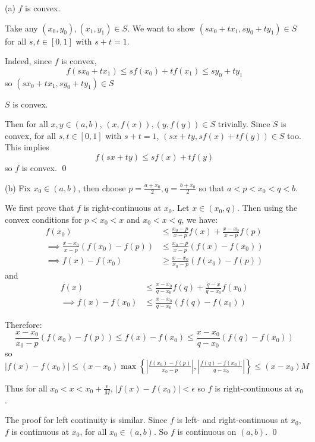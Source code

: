 \documentclass[a4paper, 11pt]{article}
\begin{document}
\begin{solution}
    (a) \pffwd $f$ is convex.
    
    Take any $(x_0, y_0), (x_1, y_1) \in S$. We want to show $(s x_0 + tx_1, sy_0 + ty_1) \in S$ for all $s, t \in [0, 1]$ with $s + t = 1$.

    Indeed, since $f$ is convex,
    \[
    f(sx_0 + tx_1) \leq sf(x_0) + tf(x_1) \leq sy_0 + ty_1
    \]
    so $(s x_0 + tx_1, sy_0 + ty_1) \in S$

    \pfbwd $S$ is convex.
    
    Then for all $x, y \in (a, b)$, $(x, f(x)), (y, f(y)) \in S$ trivially. Since $S$ is convex, for all $s, t \in [0, 1]$ with $s+ t = 1$, $(sx + ty, sf(x) + tf(y)) \in S$ too. This implies
     \[
    f(sx + ty) \leq sf(x) + tf(y)   
    \]
    so $f$ is convex. \qed

    (b) Fix $x_0 \in (a, b)$, then choose $p = \frac{a + x_0}{2}, q = \frac{b + x_0}{2}$ so that $a < p < x_0 < q < b$.

    We first prove that $f$ is right-continuous at $x_0$. Let $x \in (x_0, q)$. Then using the convex conditions for $p < x_0 < x$ and $x_0 < x < q$, we have:
    \begin{align*}
        f(x_0) &\leq \frac{x_0 - p}{x-p}f(x) + \frac{x-x_0}{x-p}f(p) \\
        \implies \frac{x- x_0}{x-p}(f(x_0) - f(p)) & \leq \frac{x_0 - p}{x-p}(f(x) - f(x_0)) \\
        \implies f(x) - f(x_0) &\geq \frac{x-x_0}{x_0 - p}(f(x_0) - f(p))
    \end{align*}
    and
    \begin{align*}
        f(x) & \leq \frac{x- x_0}{q - x_0} f(q) + \frac{q-x}{q-x_0}f(x_0) \\
        \implies f(x) - f(x_0) &\leq \frac{x- x_0}{q-x_0} (f(q) - f(x_0))
    \end{align*}

    Therefore: \[
    \frac{x-x_0}{x_0 - p}(f(x_0) - f(p)) \leq f(x) - f(x_0) \leq \frac{x-x_0}{q-x_0}(f(q) - f(x_0))
    \]
    so $|f(x) - f(x_0)| \leq (x-x_0) \max \left\{ |\frac{f(x_0) - f(p)}{x_0 - p}|, |\frac{f(q) - f(x_0)}{q-x_0}| \right\} \leq (x-x_0) M$

    Thus for all $x_0 < x < x_0 + \frac{\epsilon}{M}$, $|f(x) - f(x_0)| < \epsilon$ so $f$ is right-continuous at $x_0$.
    
    The proof for left continuity is similar. Since $f$ is left- and right-continuous at $x_0$, $f$ is continuous at $x_0$, for all $x_0 \in (a, b)$. So $f$ is continuous on $(a, b)$. \qed


\end{solution}
\end{document}
